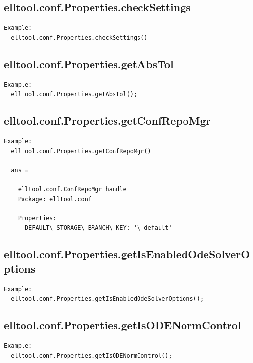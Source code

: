 \documentclass[letterpaper,10pt,english]{sphinxmanual}
\begin{document}
\subsection{elltool.conf.Properties.checkSettings}
\label{chap_functions:elltool-conf-properties-checksettings}
\begin{Verbatim}[commandchars=\\\{\}]
Example:
  elltool.conf.Properties.checkSettings()
\end{Verbatim}


\subsection{elltool.conf.Properties.getAbsTol}
\label{chap_functions:elltool-conf-properties-getabstol}
\begin{Verbatim}[commandchars=\\\{\}]
Example:
  elltool.conf.Properties.getAbsTol();
\end{Verbatim}


\subsection{elltool.conf.Properties.getConfRepoMgr}
\label{chap_functions:elltool-conf-properties-getconfrepomgr}
\begin{Verbatim}[commandchars=\\\{\}]
Example:
  elltool.conf.Properties.getConfRepoMgr()

  ans =

    elltool.conf.ConfRepoMgr handle
    Package: elltool.conf

    Properties:
      DEFAULT\_STORAGE\_BRANCH\_KEY: '\_default'
\end{Verbatim}


\subsection{elltool.conf.Properties.getIsEnabledOdeSolverOptions}
\label{chap_functions:elltool-conf-properties-getisenabledodesolveroptions}
\begin{Verbatim}[commandchars=\\\{\}]
Example:
  elltool.conf.Properties.getIsEnabledOdeSolverOptions();
\end{Verbatim}


\subsection{elltool.conf.Properties.getIsODENormControl}
\label{chap_functions:elltool-conf-properties-getisodenormcontrol}
\begin{Verbatim}[commandchars=\\\{\}]
Example:
  elltool.conf.Properties.getIsODENormControl();
\end{Verbatim}
\end{document}
